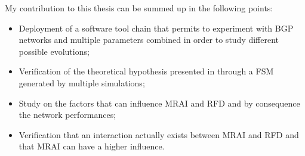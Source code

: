 My contribution to this thesis can be summed up in the following points:
\begin{itemize}
		\item Deployment of a software tool chain that permits to experiment
		with \ac{BGP} networks and multiple parameters combined in order to study
		different possible evolutions;
		\item Verification of the theoretical hypothesis presented in
		\cite{griffinFSM,fabrikant2011there} through a \ac{FSM} generated by
		multiple simulations;
		\item Study on the factors that can influence \ac{MRAI} and \ac{RFD} and
		by consequence the network performances;
		\item Verification that an interaction actually exists between \ac{MRAI}
		and \ac{RFD} and that \ac{MRAI} can have a higher influence.
\end{itemize}
